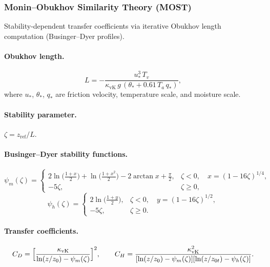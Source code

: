 \documentclass[11pt,a4paper]{article}
\begin{document}
\subsubsection{Monin--Obukhov Similarity Theory (MOST)}

Stability-dependent transfer coefficients via iterative Obukhov length computation (Businger--Dyer profiles).

\paragraph{Obukhov length.}
\begin{equation}
  L = -\frac{u_*^3\,T_v}{\kappa_{\mathrm{vK}}\,g\,(\theta_*+0.61\,T_a\,q_*)},
\end{equation}
where $u_*$, $\theta_*$, $q_*$ are friction velocity, temperature scale, and moisture scale.

\paragraph{Stability parameter.}  $\zeta=z_{\mathrm{ref}}/L$.

\paragraph{Businger--Dyer stability functions.}
\begin{equation}
  \psi_m(\zeta) = \begin{cases}
    2\ln\!\bigl(\frac{1+x}{2}\bigr)+\ln\!\bigl(\frac{1+x^2}{2}\bigr)-2\arctan x+\frac{\pi}{2}, & \zeta<0, \quad x=(1-16\zeta)^{1/4}, \\[4pt]
    -5\zeta, & \zeta\ge 0,
  \end{cases}
\end{equation}
\begin{equation}
  \psi_h(\zeta) = \begin{cases}
    2\ln\!\bigl(\frac{1+y}{2}\bigr), & \zeta<0, \quad y=(1-16\zeta)^{1/2}, \\[4pt]
    -5\zeta, & \zeta\ge 0.
  \end{cases}
\end{equation}

\paragraph{Transfer coefficients.}
\begin{equation}
  C_D = \Bigl[\frac{\kappa_{\mathrm{vK}}}{\ln(z/z_0)-\psi_m(\zeta)}\Bigr]^2, \qquad
  C_H = \frac{\kappa_{\mathrm{vK}}^2}{[\ln(z/z_0)-\psi_m(\zeta)][\ln(z/z_{0t})-\psi_h(\zeta)]}.
\end{equation}
\end{document}
